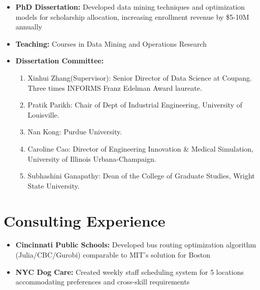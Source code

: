 \documentclass[12pt,a4paper,sans]{moderncv}
\begin{document}
{
    \begin{itemize}
        \item \textbf{PhD Dissertation:} Developed data mining techniques and optimization models for scholarship allocation, increasing enrollment revenue by \$5-10M annually
        \item \textbf{Teaching:} Courses in Data Mining and Operations Research
            \item \textbf{Dissertation Committee:}
    \begin{enumerate}
\item Xinhui Zhang(Supervisor): Senior Director of Data Science at Coupang. Three times INFORMS Franz Edelman Award laureate.
\item Pratik Parikh: Chair of Dept of Industrial Engineering, University of Louisville.
\item Nan Kong: Purdue University. 
\item Caroline Cao: Director of Engineering Innovation \& Medical Simulation, University of Illinois Urbana-Champaign.
\item Subhashini Ganapathy: Dean of the College of Graduate Studies, Wright State University.
\end{enumerate}
    \end{itemize}
}

\section{Consulting Experience}
{
    \begin{itemize}
        \item \textbf{Cincinnati Public Schools:} Developed bus routing optimization algorithm (Julia/CBC/Gurobi) comparable to MIT's solution for Boston
        \item \textbf{NYC Dog Care:} Created weekly staff scheduling system for 5 locations accommodating preferences and cross-skill requirements
    \end{itemize}
}
\end{document}
